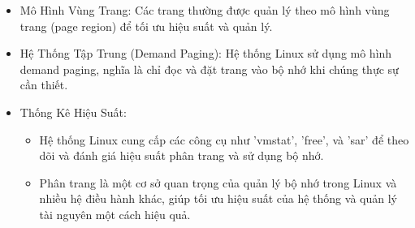 \documentclass[12pt,a4paper]{article}
\begin{document}
\begin{itemize}
\begin{itemize}
	\end{itemize}
	\item Mô Hình Vùng Trang: Các trang thường được quản lý theo mô hình vùng trang (page region) để tối ưu hiệu suất và quản lý.
	\item Hệ Thống Tập Trung (Demand Paging): Hệ thống Linux sử dụng mô hình demand paging, nghĩa là chỉ đọc và đặt trang vào bộ nhớ khi chúng thực sự cần thiết.
	\item Thống Kê Hiệu Suất:
	\begin{itemize}
		\item Hệ thống Linux cung cấp các công cụ như 'vmstat', 'free', và 'sar' để theo dõi và đánh giá hiệu suất phân trang và sử dụng bộ nhớ.
		\item Phân trang là một cơ sở quan trọng của quản lý bộ nhớ trong Linux và nhiều hệ điều hành khác, giúp tối ưu hiệu suất của hệ thống và quản lý tài nguyên một cách hiệu quả. 
	\end{itemize}
\end{itemize}
\end{document}
